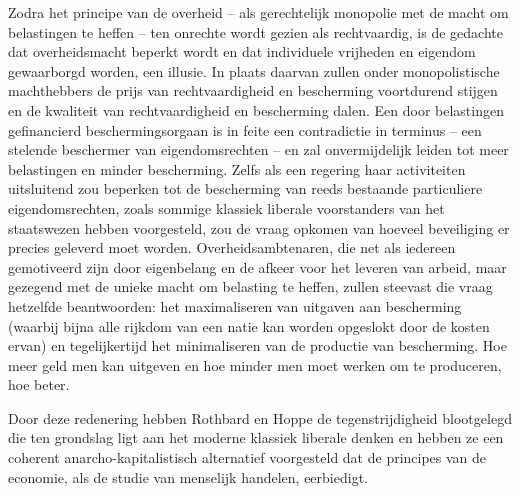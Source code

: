 \begin{blockquotebox}
Zodra het principe van de overheid -- als gerechtelijk monopolie met de macht om belastingen te heffen -- ten onrechte wordt gezien als rechtvaardig, is de gedachte dat overheidsmacht beperkt wordt en dat individuele vrijheden en eigendom gewaarborgd worden, een illusie. In plaats daarvan zullen onder monopolistische machthebbers de prijs van rechtvaardigheid en bescherming voortdurend stijgen en de kwaliteit van rechtvaardigheid en bescherming dalen. Een door belastingen gefinancierd beschermingsorgaan is in feite een contradictie in terminus -- een stelende beschermer van eigendomsrechten -- en zal onvermijdelijk leiden tot meer belastingen en minder bescherming. Zelfs als een regering haar activiteiten uitsluitend zou beperken tot de bescherming van reeds bestaande particuliere eigendomsrechten, zoals sommige klassiek liberale voorstanders van het staatswezen hebben voorgesteld, zou de vraag opkomen van hoeveel beveiliging er precies geleverd moet worden. Overheidsambtenaren, die net als iedereen gemotiveerd zijn door eigenbelang en de afkeer voor het leveren van arbeid, maar gezegend met de unieke macht om belasting te heffen, zullen steevast die vraag hetzelfde beantwoorden: het maximaliseren van uitgaven aan bescherming (waarbij bijna alle rijkdom van een natie kan worden opgeslokt door de kosten ervan) en tegelijkertijd het minimaliseren van de productie van bescherming. Hoe meer geld men kan uitgeven en hoe minder men moet werken om te produceren, hoe beter.\footnotemark
\end{blockquotebox}

Door deze redenering hebben Rothbard en Hoppe de tegenstrijdigheid blootgelegd die ten grondslag ligt aan het moderne klassiek liberale denken en hebben ze een coherent anarcho-kapitalistisch alternatief voorgesteld dat de principes van de economie, als de studie van menselijk handelen, eerbiedigt.

